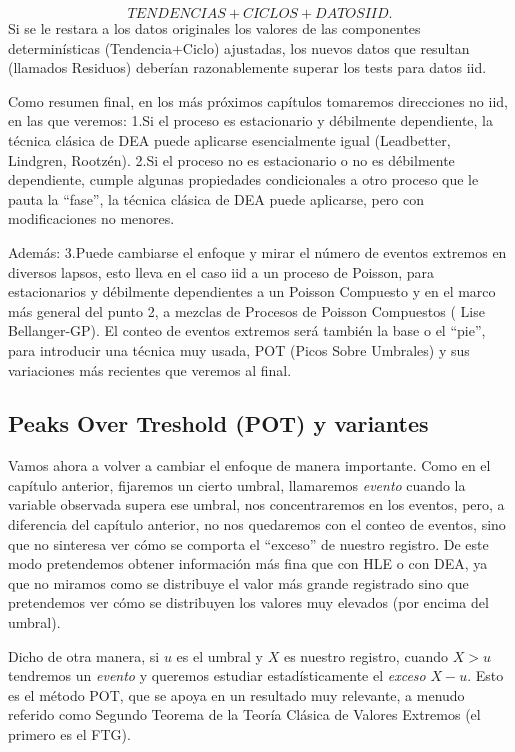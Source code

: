 \documentclass[
  12pt]{article}
\begin{document}
\[
TENDENCIAS+CICLOS+ DATOS IID.
\] Si se le restara a los datos originales los valores de las
componentes determinísticas (Tendencia+Ciclo) ajustadas, los nuevos
datos que resultan (llamados Residuos) deberían razonablemente superar
los tests para datos iid.

Como resumen final, en los más próximos capítulos tomaremos direcciones
no iid, en las que veremos: 1.Si el proceso es estacionario y débilmente
dependiente, la técnica clásica de DEA puede aplicarse esencialmente
igual (Leadbetter, Lindgren, Rootzén). 2.Si el proceso no es
estacionario o no es débilmente dependiente, cumple algunas propiedades
condicionales a otro proceso que le pauta la ``fase'', la técnica
clásica de DEA puede aplicarse, pero con modificaciones no menores.

Además: 3.Puede cambiarse el enfoque y mirar el número de eventos
extremos en diversos lapsos, esto lleva en el caso iid a un proceso de
Poisson, para estacionarios y débilmente dependientes a un Poisson
Compuesto y en el marco más general del punto 2, a mezclas de Procesos
de Poisson Compuestos ( Lise Bellanger-GP). El conteo de eventos
extremos será también la base o el ``pie'', para introducir una técnica
muy usada, POT (Picos Sobre Umbrales) y sus variaciones más recientes
que veremos al final.

\newpage

\subsection{Peaks Over Treshold (POT) y
variantes}\label{peaks-over-treshold-pot-y-variantes}

Vamos ahora a volver a cambiar el enfoque de manera importante. Como en
el capítulo anterior, fijaremos un cierto umbral, llamaremos
\emph{evento} cuando la variable observada supera ese umbral, nos
concentraremos en los eventos, pero, a diferencia del capítulo anterior,
no nos quedaremos con el conteo de eventos, sino que no sinteresa ver
cómo se comporta el ``exceso'' de nuestro registro. De este modo
pretendemos obtener información más fina que con HLE o con DEA, ya que
no miramos como se distribuye el valor más grande registrado sino que
pretendemos ver cómo se distribuyen los valores muy elevados (por encima
del umbral).

Dicho de otra manera, si \(u\) es el umbral y \(X\) es nuestro registro,
cuando \(X>u\) tendremos un \emph{evento} y queremos estudiar
estadísticamente el \emph{exceso} \(X-u\). Esto es el método POT, que se
apoya en un resultado muy relevante, a menudo referido como Segundo
Teorema de la Teoría Clásica de Valores Extremos (el primero es el FTG).
\end{document}
